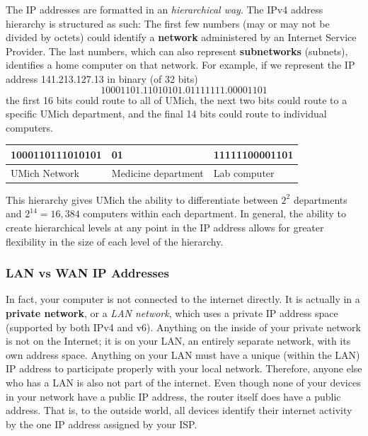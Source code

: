 \documentclass{article}
\begin{document}
  \begin{definition}
  The IP addresses are formatted in an \textit{hierarchical way}. The IPv4 address hierarchy is structured as such: The first few numbers (may or may not be divided by octets) could identify a \textbf{network} administered by an Internet Service Provider. The last numbers, which can also represent \textbf{subnetworks} (subnets), identifies a home computer on that network. For example, if we represent the IP address 141.213.127.13 in binary (of 32 bits)
  \[10001101.11010101.01111111.00001101\]
  the first 16 bits could route to all of UMich, the next two bits could route to a specific UMich department, and the final 14 bits could route to individual computers. 
  \begin{center}
  \begin{tabular}{l|l|l}
      1000110111010101 & 01 & 11111100001101  \\
      \hline
      UMich Network & Medicine department & Lab computer 
  \end{tabular}
  \end{center}
  This hierarchy gives UMich the ability to differentiate between $2^2$ departments and $2^{14} = 16,384$ computers within each department. In general, the ability to create hierarchical levels at any point in the IP address allows for greater flexibility in the size of each level of the hierarchy. 
  \end{definition}

  \subsubsection{LAN vs WAN IP Addresses}
  In fact, your computer is not connected to the internet directly. It is actually in a \textbf{private network}, or a \textit{LAN network}, which uses a private IP address space (supported by both IPv4 and v6). Anything on the inside of your private network is not on the Internet; it is on your LAN, an entirely separate network, with its own address space. Anything on your LAN must have a unique (within the LAN) IP address to participate properly with your local network. Therefore, anyone else who has a LAN is also not part of the internet. Even though none of your devices in your network have a public IP address, the router itself does have a public address. That is, to the outside world, all devices identify their internet activity by the one IP address assigned by your ISP.  
\end{document}
